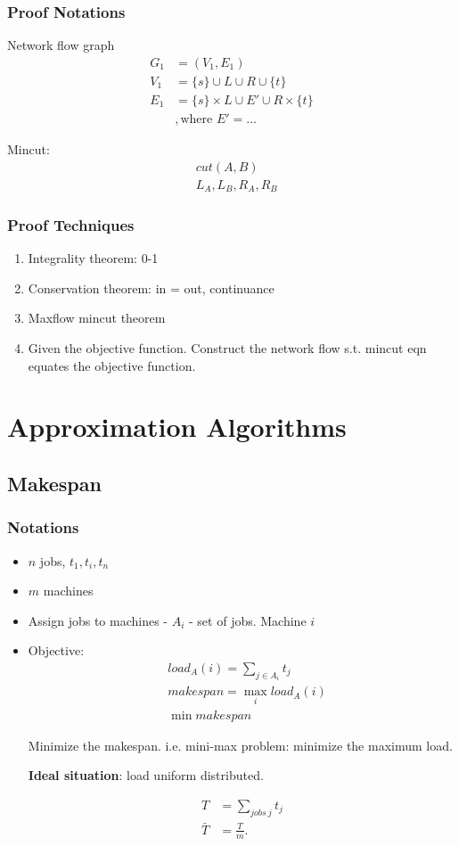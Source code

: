 \documentclass[a4paper]{report}
\theoremstyle{definition}
\begin{document}
\subsection{Proof Notations}
Network flow graph 
\begin{align*}
G_1 &= (V_1, E_1) \\  
V_1 &= \{s\} \cup L \cup R \cup \{t\} \\
E_1 &= \{s\} \times L \cup E' \cup  R\times \{t\} \\
& , \text{where  } E' =...
\end{align*}

Mincut:
\begin{align*}
& cut(A, B) \\ 
& L_A, L_B, R_A, R_B
\end{align*}


\subsection{Proof Techniques}
\begin{enumerate}
\item Integrality theorem: 0-1
\item Conservation theorem: in = out, continuance
\item Maxflow mincut theorem 
\item Given the objective function. Construct the network flow s.t. mincut eqn equates the objective function. 
\end{enumerate}

\chapter{Approximation Algorithms}
\section{Makespan}
\subsection{Notations}
\begin{itemize}
\item $n$ jobs, $t_1, t_i, t_n$
\item $m$ machines
\item Assign jobs to machines - $A_i$ - set of jobs. Machine $i$
\item Objective:
\begin{align*}
&load_A(i)=\sum_{j\in A_i} t_j\\
&makespan = \max_i load_A(i)\\
&\min makespan
\end{align*}

Minimize the makespan. i.e. mini-max problem: minimize the maximum load.

\textbf{Ideal situation}: load uniform distributed.

\begin{align*}
T&=\sum_{jobs~j}t_j\\
\bar T &= \frac{T}{m}.
\end{align*}
\end{itemize}
\end{document}
